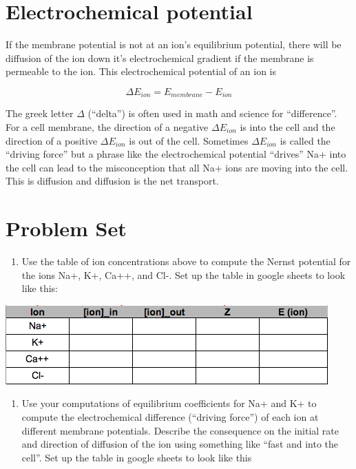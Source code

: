 \documentclass[]{book}
\providecommand{\tightlist}{%
  \setlength{\itemsep}{0pt}\setlength{\parskip}{0pt}}
\begin{document}
\section{Electrochemical potential}\label{electrochemical-potential}

If the membrane potential is not at an ion's equilibrium potential,
there will be diffusion of the ion down it's electrochemical gradient if
the membrane is permeable to the ion. This electrochemical potential of
an ion is

\begin{equation}
\Delta E_{ion} = E_{membrane} - E_{ion}
\end{equation}

The greek letter \(\Delta\) (``delta'') is often used in math and
science for ``difference''. For a cell membrane, the direction of a
negative \(\Delta E_{ion}\) is into the cell and the direction of a
positive \(\Delta E_{ion}\) is out of the cell. Sometimes
\(\Delta E_{ion}\) is called the ``driving force'' but a phrase like the
electrochemical potential ``drives'' Na+ into the cell can lead to the
misconception that all Na+ ions are moving into the cell. This is
diffusion and diffusion is the net transport.

\section{Problem Set}\label{problem-set}

\begin{enumerate}
\def\labelenumi{\arabic{enumi}.}
\tightlist
\item
  Use the table of ion concentrations above to compute the Nernst
  potential for the ions Na+, K+, Ca++, and Cl-. Set up the table in
  google sheets to look like this:
\end{enumerate}

\includegraphics{images/nernst-output_table_1.png}

\begin{enumerate}
\def\labelenumi{\arabic{enumi}.}
\setcounter{enumi}{1}
\tightlist
\item
  Use your computations of equilibrium coefficients for Na+ and K+ to
  compute the electrochemical difference (``driving force'') of each ion
  at different membrane potentials. Describe the consequence on the
  initial rate and direction of diffusion of the ion using something
  like ``fast and into the cell''. Set up the table in google sheets to
  look like this
\end{enumerate}
\end{document}

